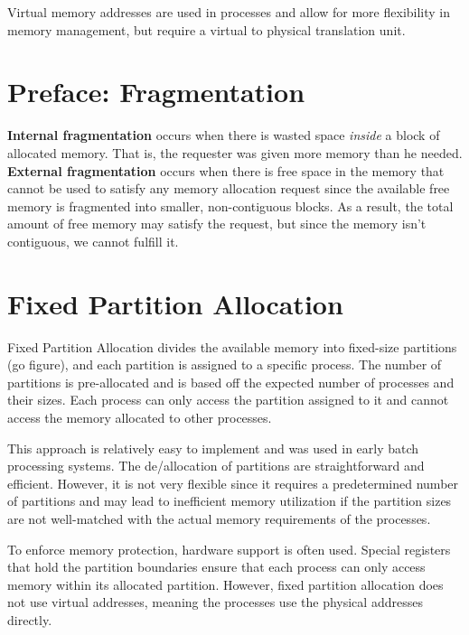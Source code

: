 \documentclass{report}
\newcommand{\definitionBegin}[1]{\begin{tcolorbox}[title={Definition: #1}]}
\newcommand{\definitionEnd}{\end{tcolorbox}}
\begin{document}
Virtual memory addresses are used in processes and allow for more flexibility in memory management,
but require a virtual to physical translation unit. 


\section*{Preface: Fragmentation}

\definitionBegin{Internal and External Fragmentation}
\textbf{Internal fragmentation} occurs when there is wasted space \textit{inside} a block of
allocated memory. That is, the requester was given more memory than he needed.
\tcblower
\textbf{External fragmentation} occurs when there is free space in the memory that cannot be used to
satisfy any memory allocation request since the available free memory is fragmented into smaller,
non-contiguous blocks. As a result, the total amount of free memory may satisfy the request, but
since the memory isn't contiguous, we cannot fulfill it.
\definitionEnd

\section{Fixed Partition Allocation}
Fixed Partition Allocation divides the available memory into fixed-size partitions (go figure), and
each partition is assigned to a specific process. The number of partitions is pre-allocated and is
based off the expected number of processes and their sizes. Each process can only access the
partition assigned to it and cannot access the memory allocated to other processes.

This approach is relatively easy to implement and was used in early batch processing systems. The
de/allocation of partitions are straightforward and efficient. However, it is not very flexible
since it requires a predetermined number of partitions and may lead to inefficient memory
utilization if the partition sizes are not well-matched with the actual memory requirements of the
processes.

To enforce memory protection, hardware support is often used. Special registers that hold the
partition boundaries ensure that each process can only access memory within its allocated
partition. However, fixed partition allocation does not use virtual addresses, meaning the processes
use the physical addresses directly.
\end{document}
